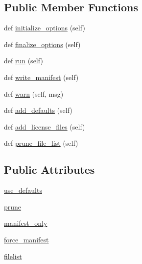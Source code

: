 \subsection*{Public Member Functions}
\begin{DoxyCompactItemize}
\item 
def \hyperlink{classsetuptools_1_1command_1_1egg__info_1_1manifest__maker_ab7483578356eab12661fbdb5a51983bf}{initialize\+\_\+options} (self)
\item 
def \hyperlink{classsetuptools_1_1command_1_1egg__info_1_1manifest__maker_ae871c5da5ea7e0eafb63b5689b480109}{finalize\+\_\+options} (self)
\item 
def \hyperlink{classsetuptools_1_1command_1_1egg__info_1_1manifest__maker_a1c18c0ba4fc94bcc22cb99acdf4e26e7}{run} (self)
\item 
def \hyperlink{classsetuptools_1_1command_1_1egg__info_1_1manifest__maker_abb201f5da34012395bbc74a7294f193b}{write\+\_\+manifest} (self)
\item 
def \hyperlink{classsetuptools_1_1command_1_1egg__info_1_1manifest__maker_a6d4e84dac2e0fa3473f8b9cfa9e942ed}{warn} (self, msg)
\item 
def \hyperlink{classsetuptools_1_1command_1_1egg__info_1_1manifest__maker_a5bb8f3befc6b69fe079f67aa239e7ef5}{add\+\_\+defaults} (self)
\item 
def \hyperlink{classsetuptools_1_1command_1_1egg__info_1_1manifest__maker_a01ec89a680a2c0ac5d57bf2cedbbd326}{add\+\_\+license\+\_\+files} (self)
\item 
def \hyperlink{classsetuptools_1_1command_1_1egg__info_1_1manifest__maker_a13f763590dea4d794ab518fe896bafa6}{prune\+\_\+file\+\_\+list} (self)
\end{DoxyCompactItemize}
\subsection*{Public Attributes}
\begin{DoxyCompactItemize}
\item 
\hyperlink{classsetuptools_1_1command_1_1egg__info_1_1manifest__maker_a03b10f5d9682f7561f5dcb2e38f481c1}{use\+\_\+defaults}
\item 
\hyperlink{classsetuptools_1_1command_1_1egg__info_1_1manifest__maker_a9c8082ebc71151c0b73f6bd1a3e136a4}{prune}
\item 
\hyperlink{classsetuptools_1_1command_1_1egg__info_1_1manifest__maker_ab9aeb0d36a2c63a0db350982766d73b6}{manifest\+\_\+only}
\item 
\hyperlink{classsetuptools_1_1command_1_1egg__info_1_1manifest__maker_a541b1e0ddee5af134df09289b06395a3}{force\+\_\+manifest}
\item 
\hyperlink{classsetuptools_1_1command_1_1egg__info_1_1manifest__maker_aab92f131371e14c3dbde6ab997e25bb0}{filelist}
\end{DoxyCompactItemize}

